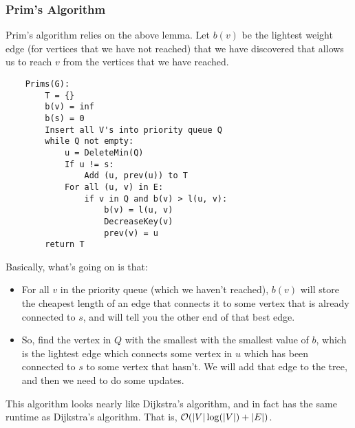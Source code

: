 \documentclass[letterpaper]{article}
\begin{document}
\subsubsection{Prim's Algorithm}
Prim's algorithm relies on the above lemma. Let $b(v)$ be the lightest weight edge (for vertices that we have not reached) that we have discovered that allows us to reach $v$ from the vertices that we have reached. 
\begin{verbatim}
    Prims(G):
        T = {}
        b(v) = inf 
        b(s) = 0
        Insert all V's into priority queue Q 
        while Q not empty:
            u = DeleteMin(Q)
            If u != s:
                Add (u, prev(u)) to T 
            For all (u, v) in E: 
                if v in Q and b(v) > l(u, v):
                    b(v) = l(u, v)
                    DecreaseKey(v)
                    prev(v) = u 
        return T 
\end{verbatim}
Basically, what's going on is that: 
\begin{itemize}
    \item For all $v$ in the priority queue (which we haven't reached), $b(v)$ will store the cheapest length of an edge that connects it to some vertex that is already connected to $s$, and  will tell you the other end of that best edge.
    \item So, find the vertex in $Q$ with the smallest with the smallest value of $b$, which is the lightest edge which connects some vertex in $u$ which has been connected to $s$ to some vertex that hasn't. We will add that edge to the tree, and then we need to do some updates. 
\end{itemize} 
This algorithm looks nearly like Dijkstra's algorithm, and in fact has the same runtime as Dijkstra's algorithm. That is, $\mathcal{O}(|V|\log(|V|) + |E|)$.
\end{document}
